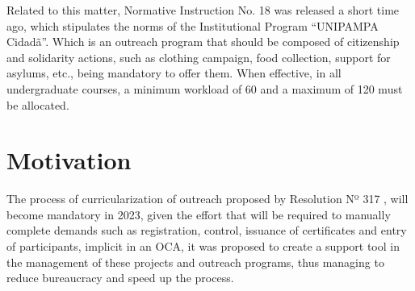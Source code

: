 Related to this matter, Normative Instruction No. 18 \cite{unipampacidada} was released a short time ago, which stipulates the norms of the Institutional Program ``UNIPAMPA Cidadã''. 
Which is an outreach program that should be composed of citizenship and solidarity actions, such as clothing campaign, food collection, support for asylums, etc., being mandatory to offer them. 
When effective, in all undergraduate courses, a minimum workload of 60 and a maximum of 120 must be allocated.

\section{Motivation}\label{sec:motivation}

The process of curricularization of outreach proposed by Resolution Nº 317 \cite{CONSUNI-Unipampa:2021}, will become mandatory in 2023, given the effort that will be required to manually complete demands such as registration, control, issuance of certificates and entry of participants, implicit in an \ac{OCA}, it was proposed to create a support tool in the management of these projects and outreach programs, thus managing to reduce bureaucracy and speed up the process.



